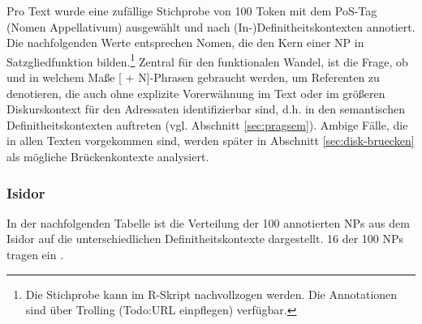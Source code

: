 Pro Text wurde eine zufällige Stichprobe von 100 Token mit dem PoS-Tag  (Nomen Appellativum) ausgewählt und nach (In-)Definitheitskontexten annotiert. Die nachfolgenden Werte entsprechen Nomen, die den Kern einer NP in Satzgliedfunktion bilden.\footnote{Die Stichprobe kann im R-Skript  nachvollzogen werden. Die Annotationen sind über Trolling (Todo:URL einpflegen) verfügbar.}   
Zentral für den funktionalen Wandel, ist die Frage, ob und in welchem Maße
[ + N]-Phrasen gebraucht werden, um Referenten zu denotieren, die auch ohne explizite Vorerwähnung im Text oder im größeren Diskurskontext für den Adressaten identifizierbar sind, d.h. in den semantischen Definitheitskontexten auftreten (vgl. Abschnitt \ref{sec:pragsem}). Ambige Fälle, die in allen Texten vorgekommen sind, werden später in Abschnitt \ref{sec:disk-bruecken} als mögliche Brückenkontexte analysiert. 

\subsubsection{Isidor} 

In der nachfolgenden Tabelle ist die Verteilung der 
100 annotierten NPs aus dem Isidor auf die unterschiedlichen Definitheitskontexte dargestellt. 16 der 100 NPs tragen ein .


